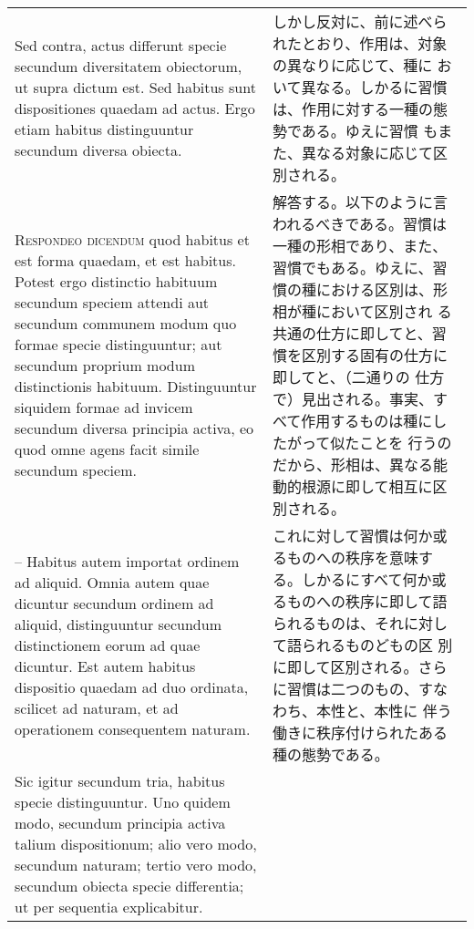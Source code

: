 \documentclass[10pt]{jsarticle}
\begin{document}
\begin{longtable}{p{21em}p{21em}}
\\

Sed contra, actus differunt specie secundum diversitatem obiectorum,
ut supra dictum est. Sed habitus sunt dispositiones quaedam ad
actus. Ergo etiam habitus distinguuntur secundum diversa obiecta.

&

しかし反対に、前に述べられたとおり、作用は、対象の異なりに応じて、種に
おいて異なる。しかるに習慣は、作用に対する一種の態勢である。ゆえに習慣
もまた、異なる対象に応じて区別される。

\\

{\scshape Respondeo dicendum} quod habitus et est forma quaedam, et
est habitus. Potest ergo distinctio habituum secundum speciem attendi
aut secundum communem modum quo formae specie distinguuntur; aut
secundum proprium modum distinctionis habituum. Distinguuntur siquidem
formae ad invicem secundum diversa principia activa, eo quod omne
agens facit simile secundum speciem.

&

解答する。以下のように言われるべきである。習慣は一種の形相であり、また、
習慣でもある。ゆえに、習慣の種における区別は、形相が種において区別され
る共通の仕方に即してと、習慣を区別する固有の仕方に即してと、（二通りの
仕方で）見出される。事実、すべて作用するものは種にしたがって似たことを
行うのだから、形相は、異なる能動的根源に即して相互に区別される。

\\

-- Habitus autem importat ordinem ad aliquid. Omnia autem quae
   dicuntur secundum ordinem ad aliquid, distinguuntur secundum
   distinctionem eorum ad quae dicuntur. Est autem habitus dispositio
   quaedam ad duo ordinata, scilicet ad naturam, et ad operationem
   consequentem naturam.

&

これに対して習慣は何か或るものへの秩序を意味する。しかるにすべて何か或
るものへの秩序に即して語られるものは、それに対して語られるものどもの区
別に即して区別される。さらに習慣は二つのもの、すなわち、本性と、本性に
伴う働きに秩序付けられたある種の態勢である。

\\

Sic igitur secundum tria, habitus specie distinguuntur. Uno quidem
modo, secundum principia activa talium dispositionum; alio vero modo,
secundum naturam; tertio vero modo, secundum obiecta specie
differentia; ut per sequentia explicabitur.


\end{longtable}
\end{document}
